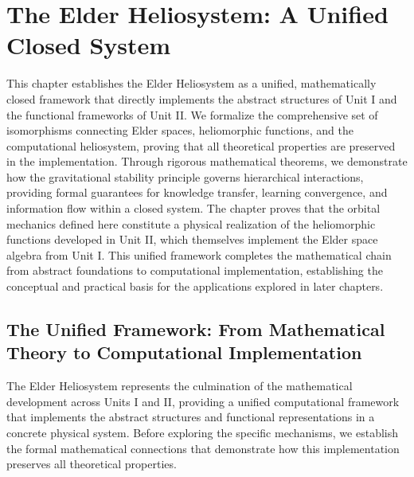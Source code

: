 \chapter{The Elder Heliosystem: A Unified Closed System}

\begin{chapterabstract}
This chapter establishes the Elder Heliosystem as a unified, mathematically closed framework that directly implements the abstract structures of Unit I and the functional frameworks of Unit II. We formalize the comprehensive set of isomorphisms connecting Elder spaces, heliomorphic functions, and the computational heliosystem, proving that all theoretical properties are preserved in the implementation. Through rigorous mathematical theorems, we demonstrate how the gravitational stability principle governs hierarchical interactions, providing formal guarantees for knowledge transfer, learning convergence, and information flow within a closed system. The chapter proves that the orbital mechanics defined here constitute a physical realization of the heliomorphic functions developed in Unit II, which themselves implement the Elder space algebra from Unit I. This unified framework completes the mathematical chain from abstract foundations to computational implementation, establishing the conceptual and practical basis for the applications explored in later chapters.
\end{chapterabstract}

\section{The Unified Framework: From Mathematical Theory to Computational Implementation}

The Elder Heliosystem represents the culmination of the mathematical development across Units I and II, providing a unified computational framework that implements the abstract structures and functional representations in a concrete physical system. Before exploring the specific mechanisms, we establish the formal mathematical connections that demonstrate how this implementation preserves all theoretical properties.

